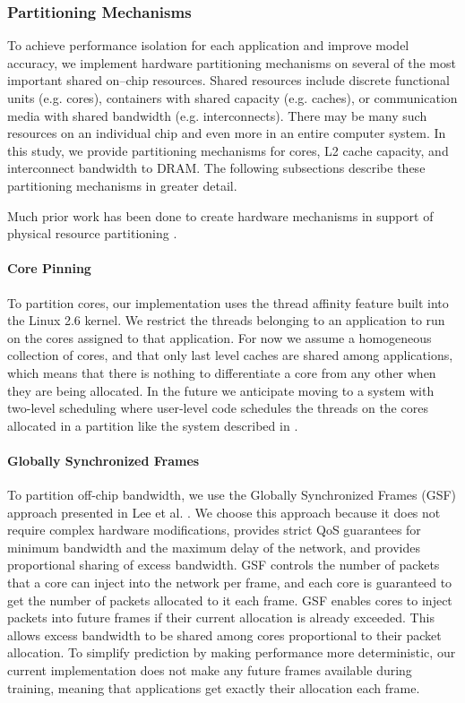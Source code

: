 \subsubsection{Partitioning Mechanisms}
To achieve performance isolation for each application and improve model accuracy, we implement hardware partitioning mechanisms on several of the most important shared on--chip  resources. Shared resources include discrete functional units (e.g. cores), containers with shared capacity (e.g. caches), or communication media with shared bandwidth (e.g. interconnects).  There may be many such resources on an individual chip and even more in an entire computer system. In this study, we provide partitioning mechanisms for cores, L2 cache capacity, and interconnect bandwidth to DRAM.
 The following subsections describe these partitioning mechanisms in greater detail.

 Much prior work has been done to create hardware mechanisms in support of physical resource partitioning \cite{876484,967444,1194855,1086328,605420,1152161,1331730, 1241608,gsf,1250671,1194858,1275005,1088154,1318096,1399982,1399973, 1069998}.

\paragraph{Core Pinning}
To partition cores, our implementation uses the thread affinity feature built into the Linux 2.6 kernel.  We restrict the threads belonging to an application to run on the cores assigned to that application.  For now we assume a homogeneous collection of cores, and that only last level caches are shared among applications, which means that there is nothing to differentiate a core from any other when they are being allocated.
In the future we anticipate moving to a system with two-level scheduling where user-level code schedules the threads on the cores allocated in a partition like the system described in \cite{lithe}.

\paragraph{Globally Synchronized Frames}
To partition off-chip bandwidth, we use the Globally Synchronized Frames (GSF) approach presented in Lee et al. \cite{gsf}.  We choose this approach because it does not require complex hardware modifications, provides strict QoS guarantees for minimum bandwidth and the maximum delay of the network, and provides proportional sharing of excess bandwidth.  GSF controls the number of packets that a core can inject into the network per frame, and each core is guaranteed to get the number of packets allocated to it each frame.  GSF enables cores to inject packets into future frames if their current allocation is already exceeded.  This allows excess bandwidth to be shared among cores proportional to their packet allocation.  To simplify prediction by making performance more deterministic, our current implementation does not make any future frames available during training, meaning that applications get exactly their allocation each frame.

